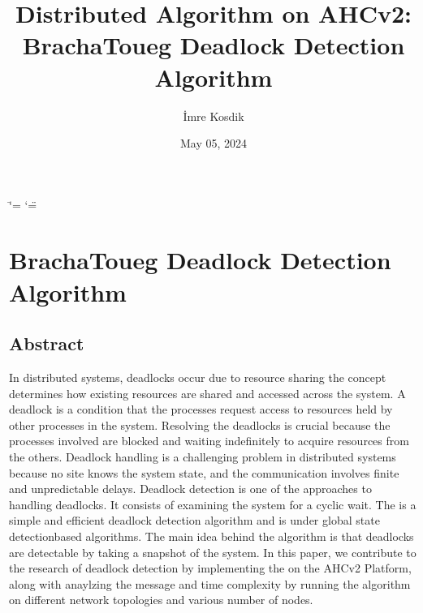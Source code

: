 \documentclass[letterpaper,10pt,english]{sphinxmanual}
\title{Distributed Algorithm on AHCv2: Bracha\sphinxhyphen{}Toueg Deadlock Detection Algorithm}
\date{May 05, 2024}
\author{İmre Kosdik}
\begin{document}
\ifdefined\shorthandoff
  \ifnum\catcode`\=\string=\active\shorthandoff{=}\fi
  \ifnum\catcode`\"=\active{}\fi
\fi

\pagestyle{empty}
\sphinxmaketitle
\pagestyle{plain}
\sphinxtableofcontents
\pagestyle{normal}
\label{\detokenize{index::doc}}


\sphinxstepscope


\chapter{Bracha\sphinxhyphen{}Toueg Deadlock Detection Algorithm}
\label{\detokenize{docs/BrachaToueg/BrachaToueg:brachatouegalg}}\label{\detokenize{docs/BrachaToueg/BrachaToueg::doc}}
\sphinxstepscope


\section{Abstract}
\label{\detokenize{docs/BrachaToueg/abstract:abstract}}\label{\detokenize{docs/BrachaToueg/abstract::doc}}
\sphinxAtStartPar
In distributed systems, deadlocks occur due to resource sharing \sphinxhyphen{} the concept determines how existing resources are shared and accessed across the system. A deadlock is a condition that the processes request access to resources held by other processes in the system. Resolving the deadlocks is crucial because the processes involved are blocked and waiting indefinitely to acquire resources from the others. Deadlock handling is a challenging problem in distributed systems because no site knows the system state, and the communication involves finite and unpredictable delays. Deadlock detection is one of the approaches to handling deadlocks. It consists of examining the system for a cyclic wait. The {\hyperref[\detokenize{docs/BrachaToueg/algorithm:brachatouegdeadlockdetectionalgorithm}]{}} is a simple and efficient deadlock detection algorithm and is under global state detection\sphinxhyphen{}based algorithms. The main idea behind the algorithm is that deadlocks are detectable by taking a snapshot of the system. In this paper, we contribute to the research of deadlock detection by implementing the {\hyperref[\detokenize{docs/BrachaToueg/algorithm:brachatouegdeadlockdetectionalgorithm}]{}} on the AHCv2 Platform, along with anaylzing the message and time complexity by running the algorithm on different network topologies and various number of nodes.
\end{document}
